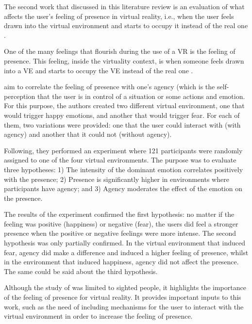 The second work that discussed in this literature review is an evaluation of what affects the user’s feeling of presence in virtual reality, i.e., when the user feels drawn into the virtual environment and starts to occupy it instead of the real one \cite{cummings2016immersive}.


One of the many feelings that flourish during the use of a VR is the feeling of presence. This feeling, inside the virtuality context, is when someone feels drawn into a VE and starts to occupy the VE instead of the real one \cite{cummings2016immersive}.

 aim to correlate the feeling of presence with one’s agency (which is the self-perception that the user is in control of a situation or some actions \cite{farrer2002experiencing} and emotion. For this purpose, the authors created two different virtual environment, one that would trigger happy emotions, and another that would trigger fear. For each of them, two variations were provided: one that the user could interact with (with agency) and another that it could not (without agency).

Following, they performed an experiment where 121 participants were randomly assigned to one of the four virtual environments. The purpose was to evaluate three hypotheses: 1) The intensity of the dominant emotion correlates positively with the presence; 2) Presence is significantly higher in environments where participants have agency; and 3) Agency moderates the effect of the emotion on the presence.

The results of the experiment confirmed the first hypothesis: no matter if the feeling was positive (happiness) or negative (fear), the users did feel a stronger presence when the positive or negative feelings were more intense. The second hypothesis was only partially confirmed. In the virtual environment that induced fear, agency did make a difference and induced a higher feeling of presence, whilst in the environment that induced happiness, agency did not affect the presence. The same could be said about the third hypothesis.

Although the study of  was limited to sighted people, it highlights the importance of the feeling of presence for virtual reality. It provides important inputs to this work, such as the need of including mechanisms for the user to interact with the virtual environment in order to increase the feeling of presence. 
